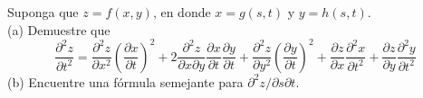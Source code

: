 \item Suponga que $z = f(x, y)$, en donde $x = g(s, t)$ y $y = h(s, t)$. \\
(a) Demuestre que
\[ \frac{\partial^2 z}{\partial t^2} = \frac{\partial^2 z}{\partial x^2} \left( \frac{\partial x}{\partial t} \right)^2 + 2 \frac{\partial^2 z}{\partial x \partial y} \frac{\partial x}{\partial t} \frac{\partial y}{\partial t} + \frac{\partial^2 z}{\partial y^2} \left( \frac{\partial y}{\partial t} \right)^2 + \frac{\partial z}{\partial x} \frac{\partial^2 x}{\partial t^2} + \frac{\partial z}{\partial y} \frac{\partial^2 y}{\partial t^2} \]
(b) Encuentre una fórmula semejante para $\partial^2 z/\partial s \partial t$.

